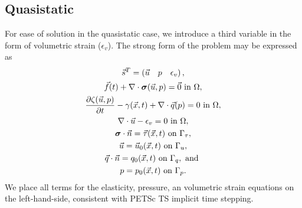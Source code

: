 \subsection{Quasistatic}

For ease of solution in the quasistatic case, we introduce a third
variable in the form of volumetric strain ($\epsilon_v$).  The
strong form of the problem may be expressed as
\begin{gather}
\vec{s}^{T} = \left(\vec{u} \quad p \quad \epsilon_v\right), \\
\vec{f}(t) + \nabla \cdot \bm{\sigma}(\vec{u},p) = \vec{0} \text{ in } \Omega, \\
\frac{\partial \zeta(\vec{u},p)}{\partial t} - \gamma(\vec{x},t) + \nabla \cdot \vec{q}(p) = 0 \text{ in } \Omega, \\
\nabla \cdot \vec{u} - \epsilon_{v} = 0 \text{ in } \Omega, \\
\bm{\sigma} \cdot \vec{n} = \vec{\tau}(\vec{x},t) \text{ on } \Gamma_{\tau}, \\
\vec{u} = \vec{u}_0(\vec{x}, t) \text{ on } \Gamma_{u}, \\
\vec{q} \cdot \vec{n} = q_0(\vec{x}, t) \text{ on } \Gamma_{q}, \text{ and } \\
p = p_0(\vec{x},t) \text{ on } \Gamma_{p}.
\end{gather}
We place all terms for the elasticity, pressure, an volumetric strain
equations on the left-hand-side, consistent with PETSc TS implicit
time stepping.


